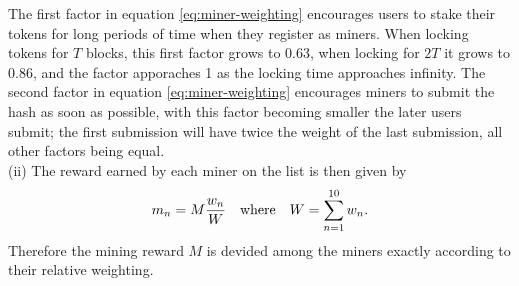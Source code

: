 The first factor in equation \eqref{eq:miner-weighting} encourages users to stake their tokens for long periods of time when they register as miners. When locking tokens for $T$ blocks, this first factor grows to 0.63, when locking for $2T$ it grows to 0.86, and the factor apporaches 1 as the locking time approaches infinity. The second factor in equation \eqref{eq:miner-weighting} encourages miners to submit the hash as soon as possible, with this factor becoming smaller the later users submit; the first submission will have twice the weight of the last submission, all other factors being equal.\\

\noindent (ii) The reward earned by each miner on the list is then given by
\begin{equation}\label{eq:miner-payout}
 m_n = M \frac{w_n}{W} \quad \textnormal{where} \quad W = \sum_{n=1}^{10} w_n.
\end{equation}
Therefore the mining reward $M$ is devided among the miners exactly according to their relative weighting. 
% 
% 
% 
% 
% 
